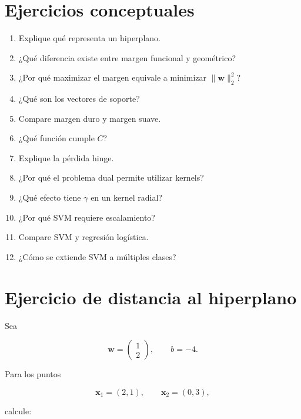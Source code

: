 \documentclass[
  spanish,
  10.5pt,
  letterpaper,
  DIV=11,
  numbers=noendperiod,
  oneside,
  open=any]{scrreprt}
\providecommand{\tightlist}{%
  \setlength{\itemsep}{0pt}\setlength{\parskip}{0pt}}
\theoremstyle{definition}
\theoremstyle{definition}
\theoremstyle{plain}
\theoremstyle{remark}
\begin{document}
\section*{Ejercicios conceptuales}\label{ejercicios-conceptuales-13}


\begin{enumerate}
\def\labelenumi{\arabic{enumi}.}
\tightlist
\item
  Explique qué representa un hiperplano.
\item
  ¿Qué diferencia existe entre margen funcional y geométrico?
\item
  ¿Por qué maximizar el margen equivale a minimizar
  \(\|\mathbf{w}\|_2^2\)?
\item
  ¿Qué son los vectores de soporte?
\item
  Compare margen duro y margen suave.
\item
  ¿Qué función cumple \(C\)?
\item
  Explique la pérdida hinge.
\item
  ¿Por qué el problema dual permite utilizar kernels?
\item
  ¿Qué efecto tiene \(\gamma\) en un kernel radial?
\item
  ¿Por qué SVM requiere escalamiento?
\item
  Compare SVM y regresión logística.
\item
  ¿Cómo se extiende SVM a múltiples clases?
\end{enumerate}

\section*{Ejercicio de distancia al
hiperplano}\label{ejercicio-de-distancia-al-hiperplano}


Sea

\[
\mathbf{w}
=
\begin{pmatrix}
1\\
2
\end{pmatrix},
\qquad
b=-4.
\]

Para los puntos

\[
\mathbf{x}_1=(2,1),
\qquad
\mathbf{x}_2=(0,3),
\]

calcule:
\end{document}
